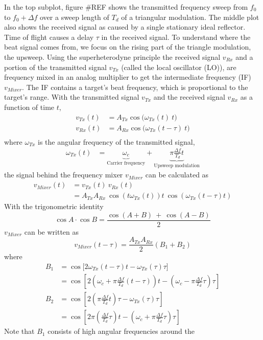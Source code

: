 In the top subplot, figure \#REF shows the transmitted frequency sweep
from \(f_0\) to \(f_0 + \Delta f\) over a sweep length of \(T_d\) of a
triangular modulation. The middle plot also shows the received signal as
caused by a single stationary ideal reflector. Time of flight causes a
delay \(\tau\) in the received signal. To understand where the beat
signal comes from, we focus on the rising part of the triangle
modulation, the upsweep. Using the superheterodyne principle the
received signal \(v_{Rx}\) and a portion of the transmitted signal
\(v_{Tx}\) (called the local oscillator (LO)), are frequency mixed in an
analog multiplier to get the intermediate frequency (IF) \(v_{Mixer}\).
The IF contains a target's beat frequency, which is proportional to the
target's range. With the transmitted signal \(v_{Tx}\) and the received
signal \(v_{Rx}\) as a function of time \(t\), \[
\begin{align}
v_{Tx}(t) &= A_{Tx} \cos\bigl(\omega_{Tx}(t)~t\bigr)\\
v_{Rx}(t) &= A_{Rx} \cos\bigl(\omega_{Tx}(t-\tau)~t\bigr)\\
\end{align}
\] where \(\omega_{Tx}\) is the angular frequency of the transmitted
signal, \[
\begin{align}
\omega_{Tx}(t) &= \underbrace{\omega_c}_\text{Carrier frequency} + \underbrace{\pi \frac{\Delta f}{T_d} t}_\text{Upsweep modulation}
\end{align}
\] the signal behind the frequency mixer \(v_{Mixer}\) can be calculated
as \[
\begin{align}
v_{Mixer}(t) &= v_{Tx}(t) ~ v_{Rx}(t) \\
&= A_{Tx}A_{Rx}~\cos(t\omega_{Tx}(t))t~\cos(\omega_{Tx}(t-\tau)t)
\end{align}
\] With the trigonometric identity
\[ \cos A \cdot \cos B = \frac{ \cos(A+B)~+~\cos(A-B) }{2} \]
\(v_{Mixer}\) can be written as \[
v_{Mixer}(t-\tau) = \frac{A_{Tx} A_{Rx}}{2}(B_1 + B_2)
\] where \[
\begin{align}
B_1 &= \cos\bigl[ 2\omega_{Tx}(t-\tau) t - \omega_{Tx}(\tau)\tau \bigr]\\
    &= \cos\left[ 2\left(\omega_c + \pi\frac{\Delta f}{T_d}(t-\tau)\right)t - \left(\omega_c - \pi\frac{\Delta f}{T_d}\tau\right)\tau \right]\\
B_2 &= \cos\left[ 2\left(\pi\frac{\Delta f}{T_d}t\right)\tau - \omega_{Tx}(\tau)\tau \right]\\
    &= \cos\left[ 2\pi\left(\frac{\Delta f}{T_d}\tau\right)t - \left(\omega_c + \pi\frac{\Delta f}{T_d}\tau\right)\tau \right]
\end{align}
\] Note that \(B_1\) consists of high angular frequencies around the

